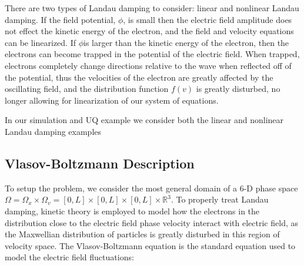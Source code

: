 \documentclass{article}
\begin{document}
\vspace{0.01cm}

There are two types of Landau damping to consider: linear and nonlinear Landau damping. If the field potential, $\phi$, is small then the electric field amplitude does not effect the kinetic energy of the electron, and the field and velocity equations can be linearized. If $\phi$is larger than the kinetic energy of the electron, then the electrons can become trapped in the potential of the electric field. When trapped, electrons completely change directions relative to the wave when reflected off of the potential, thus the velocities of the electron are greatly affected by the oscillating field, and the distribution function $f(v)$ is greatly disturbed, no longer allowing for linearization of our system of equations. \\

\vspace{0.01cm}

In our simulation and UQ example we consider both the linear and nonlinear Landau damping examples\\ 

\vspace{0.01cm}
\subsection{Vlasov-Boltzmann Description}
To setup the problem, we consider the most general domain of a 6-D phase space $\Omega = \Omega_x\times \Omega_v = [0,L]\times[0,L]\times[0,L]\times \mathbb{R}^3$. To properly treat Landau damping, kinetic theory is employed to model how the electrons in the distribution close to the electric field phase velocity interact with electric field, as the Maxwellian distribution of particles is greatly disturbed in this region of velocity space.  The Vlasov-Boltzmann equation is the standard equation used to model the electric field fluctuations:
\end{document}
